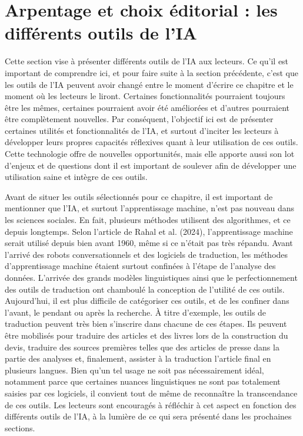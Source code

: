 \documentclass[
  letterpaper,
  DIV=11,
  numbers=noendperiod,
  oneside]{scrreprt}
\begin{document}
\hypertarget{arpentage-et-choix-uxe9ditorial-les-diffuxe9rents-outils-de-lia}{%
\section{Arpentage et choix éditorial : les différents outils de
l'IA}\label{arpentage-et-choix-uxe9ditorial-les-diffuxe9rents-outils-de-lia}}

Cette section vise à présenter différents outils de l'IA aux lecteurs.
Ce qu'il est important de comprendre ici, et pour faire suite à la
section précédente, c'est que les outils de l'IA peuvent avoir changé
entre le moment d'écrire ce chapitre et le moment où les lecteurs le
liront. Certaines fonctionnalités pourraient toujours être les mêmes,
certaines pourraient avoir été améliorées et d'autres pourraient être
complètement nouvelles. Par conséquent, l'objectif ici est de présenter
certaines utilités et fonctionnalités de l'IA, et surtout d'inciter les
lecteurs à développer leurs propres capacités réflexives quant à leur
utilisation de ces outils. Cette technologie offre de nouvelles
opportunités, mais elle apporte aussi son lot d'enjeux et de questions
dont il est important de soulever afin de développer une utilisation
saine et intègre de ces outils.

Avant de situer les outils sélectionnés pour ce chapitre, il est
important de mentionner que l'IA, et surtout l'apprentissage machine,
n'est pas nouveau dans les sciences sociales. En fait, plusieurs
méthodes utilisent des algorithmes, et ce depuis longtemps. Selon
l'article de Rahal et al. (2024), l'apprentissage machine serait utilisé
depuis bien avant 1960, même si ce n'était pas très répandu. Avant
l'arrivé des robots conversationnels et des logiciels de traduction, les
méthodes d'apprentissage machine étaient surtout confinées à l'étape de
l'analyse des données. L'arrivée des grands modèles linguistiques ainsi
que le perfectionnement des outils de traduction ont chamboulé la
conception de l'utilité de ces outils. Aujourd'hui, il est plus
difficile de catégoriser ces outils, et de les confiner dans l'avant, le
pendant ou après la recherche. À titre d'exemple, les outils de
traduction peuvent très bien s'inscrire dans chacune de ces étapes. Ils
peuvent être mobilisés pour traduire des articles et des livres lors de
la construction du devis, traduire des sources premières telles que des
articles de presse dans la partie des analyses et, finalement, assister
à la traduction l'article final en plusieurs langues. Bien qu'un tel
usage ne soit pas nécessairement idéal, notamment parce que certaines
nuances linguistiques ne sont pas totalement saisies par ces logiciels,
il convient tout de même de reconnaître la transcendance de ces outils.
Les lecteurs sont encouragés à réfléchir à cet aspect en fonction des
différents outils de l'IA, à la lumière de ce qui sera présenté dans les
prochaines sections.
\end{document}
